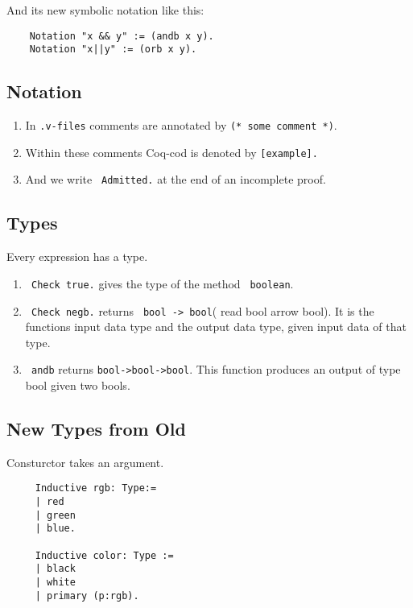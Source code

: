     And its new symbolic notation like this:
    \begin{lstlisting}
    Notation "x && y" := (andb x y).
    Notation "x||y" := (orb x y).
    \end{lstlisting}
    
     
\subsection{Notation}
     
    \begin{enumerate}
     \item In \texttt{.v-files} comments are annotated by \lstinline!(* some comment *)!. 
     \item Within these comments Coq-cod is denoted by \lstinline![example].! 
     \item And we write \lstinline! Admitted.! at the end of an incomplete proof.    
     \end{enumerate}
     
     
\subsection{Types}

     Every expression has a type.
     \begin{enumerate}
     \item  \lstinline! Check true.! gives the type of the method \lstinline! boolean!.
     \item \lstinline! Check negb.! returns \lstinline! bool -> bool!( read \glqq bool arrow bool\grqq).
      It is the functions input data type and the output data type, given input data of that type.
      \item \lstinline! andb! returns \lstinline!bool->bool->bool!. This function produces an output of type bool given two bools.
     \end{enumerate}
     
\subsection{New Types from Old}
	
	Consturctor takes an argument.
	\begin{lstlisting}
	 Inductive rgb: Type:=
	 | red 
	 | green
	 | blue.
	 
	 Inductive color: Type := 
	 | black
	 | white
	 | primary (p:rgb).
	 
	 \end{lstlisting}
	 
     
     
     